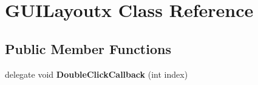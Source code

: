 \hypertarget{class_g_u_i_layoutx}{}\section{G\+U\+I\+Layoutx Class Reference}
\label{class_g_u_i_layoutx}
\subsection*{Public Member Functions}
\begin{DoxyCompactItemize}
\item 
\mbox{\label{class_g_u_i_layoutx_ad636807bfe6952505099a4c3be54080d}} 
delegate void {\bfseries Double\+Click\+Callback} (int index)
\end{DoxyCompactItemize}
